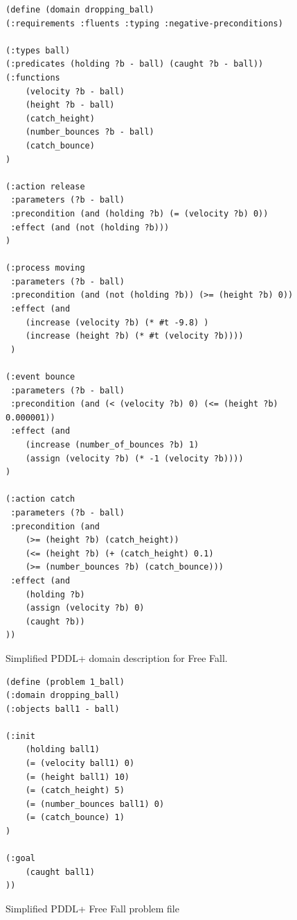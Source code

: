 \begin{figure}[thb]
\small
\begin{BVerbatim}
(define (domain dropping_ball)
(:requirements :fluents :typing :negative-preconditions)

(:types ball)
(:predicates (holding ?b - ball) (caught ?b - ball))
(:functions
    (velocity ?b - ball)
    (height ?b - ball)
    (catch_height)
    (number_bounces ?b - ball)
    (catch_bounce)
)

(:action release
 :parameters (?b - ball)
 :precondition (and (holding ?b) (= (velocity ?b) 0))
 :effect (and (not (holding ?b)))
)

(:process moving
 :parameters (?b - ball)
 :precondition (and (not (holding ?b)) (>= (height ?b) 0))
 :effect (and
    (increase (velocity ?b) (* #t -9.8) )
    (increase (height ?b) (* #t (velocity ?b))))
 )
 
(:event bounce
 :parameters (?b - ball)
 :precondition (and (< (velocity ?b) 0) (<= (height ?b) 0.000001))
 :effect (and 
    (increase (number_of_bounces ?b) 1)
    (assign (velocity ?b) (* -1 (velocity ?b))))
)

(:action catch
 :parameters (?b - ball)
 :precondition (and
    (>= (height ?b) (catch_height))
    (<= (height ?b) (+ (catch_height) 0.1)
    (>= (number_bounces ?b) (catch_bounce)))
 :effect (and
    (holding ?b)
    (assign (velocity ?b) 0)
    (caught ?b))
))
\end{BVerbatim}
\caption{Simplified PDDL+ domain description for Free Fall.}
\label{fig:freefall domain}
\end{figure}

\begin{figure}[thb]
\small
\centering
\begin{BVerbatim}
(define (problem 1_ball)
(:domain dropping_ball)
(:objects ball1 - ball)

(:init 
    (holding ball1)
    (= (velocity ball1) 0)
    (= (height ball1) 10)
    (= (catch_height) 5)
    (= (number_bounces ball1) 0)
    (= (catch_bounce) 1)
)

(:goal
    (caught ball1)
))
\end{BVerbatim}
\caption{Simplified PDDL+ Free Fall problem file}
\label{fig:freefall problem}
\end{figure}

